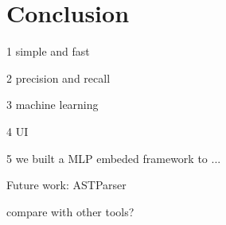 \documentclass[../main.tex]{subfiles}
\begin{document}
\section{Conclusion}

1 simple and fast

2 precision and recall

3 machine learning

4 UI

5 we built a MLP embeded framework to ... 

Future work: ASTParser

compare with other tools?
\end{document}
